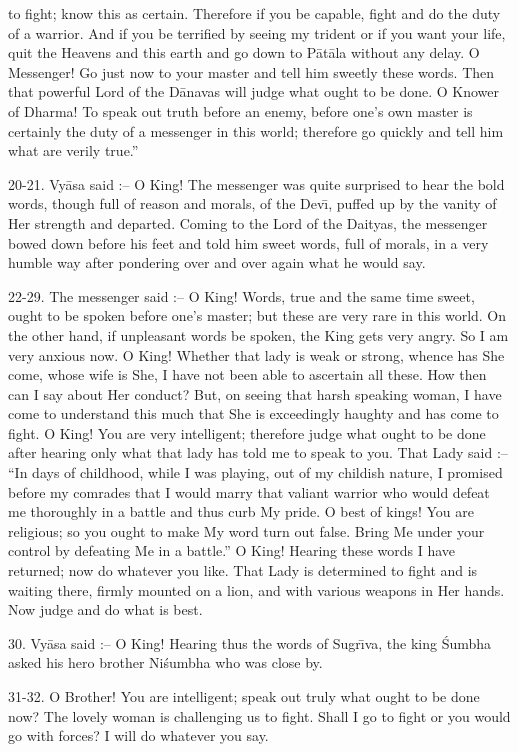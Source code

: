 to fight; know this as certain. Therefore if you be capable, fight and do the duty of a warrior. And if you be terrified by seeing my trident or if you want your life, quit the Heavens and this earth and go down to P\=at\=ala without any delay. O Messenger! Go just now to your master and tell him sweetly these words. Then that powerful Lord of the D\=anavas will judge what ought to be done. O Knower of Dharma! To speak out truth before an enemy, before one's own master is certainly the duty of a messenger in this world; therefore go quickly and tell him what are verily true.''

20-21. Vy\=asa said :-- O King! The messenger was quite surprised to hear the bold words, though full of reason and morals, of the Dev\={\i}, puffed up by the vanity of Her strength and departed. Coming to the Lord of the Daityas, the messenger bowed down before his feet and told him sweet words, full of morals, in a very humble way after pondering over and over again what he would say.

22-29. The messenger said :-- O King! Words, true and the same time sweet, ought to be spoken before one's master; but these are very rare in this world. On the other hand, if unpleasant words be spoken, the King gets very angry. So I am very anxious now. O King! Whether that lady is weak or strong, whence has She come, whose wife is She, I have not been able to ascertain all these. How then can I say about Her conduct? But, on seeing that harsh speaking woman, I have come to understand this much that She is exceedingly haughty and has come to fight. O King! You are very intelligent; therefore judge what ought to be done after hearing only what that lady has told me to speak to you. That Lady said :-- ``In days of childhood, while I was playing, out of my childish nature, I promised before my comrades that I would marry that valiant warrior who would defeat me thoroughly in a battle and thus curb My pride. O best of kings! You are religious; so you ought to make My word turn out false. Bring Me under your control by defeating Me in a battle.'' O King! Hearing these words I have returned; now do whatever you like. That Lady is determined to fight and is waiting there, firmly mounted on a lion, and with various weapons in Her hands. Now judge and do what is best.

30. Vy\=asa said :-- O King! Hearing thus the words of Sugr\={\i}va, the king \'Sumbha asked his hero brother Ni\'sumbha who was close by.

31-32. O Brother! You are intelligent; speak out truly what ought to be done now? The lovely woman is challenging us to fight. Shall I go to fight or you would go with forces? I will do whatever you say.

